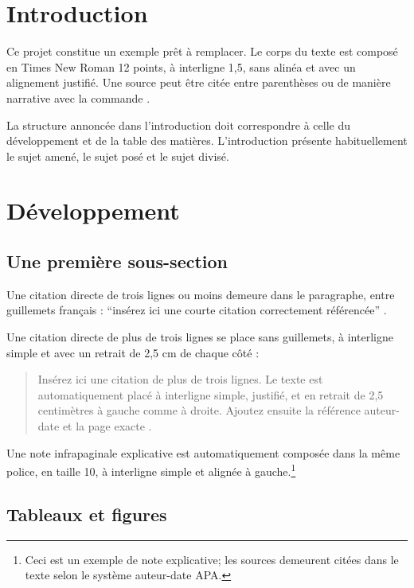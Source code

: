 \section{Introduction}

Ce projet constitue un exemple prêt à remplacer. Le corps du texte est composé en Times New Roman 12 points, à interligne 1,5, sans alinéa et avec un alignement justifié. Une source peut être citée entre parenthèses \parencite[33--40]{gaudreau2011} ou de manière narrative avec la commande \textcite{loiseau2026}.

La structure annoncée dans l'introduction doit correspondre à celle du développement et de la table des matières. L'introduction présente habituellement le sujet amené, le sujet posé et le sujet divisé.

\section{Développement}

\subsection{Une première sous-section}

Une citation directe de trois lignes ou moins demeure dans le paragraphe, entre guillemets français : \enquote{insérez ici une courte citation correctement référencée} \parencite[18]{loiseau2026}.

Une citation directe de plus de trois lignes se place sans guillemets, à interligne simple et avec un retrait de 2,5 cm de chaque côté :

\begin{quote}
Insérez ici une citation de plus de trois lignes. Le texte est automatiquement placé à interligne simple, justifié, et en retrait de 2,5 centimètres à gauche comme à droite. Ajoutez ensuite la référence auteur-date et la page exacte \parencite[19]{loiseau2026}.
\end{quote}

Une note infrapaginale explicative est automatiquement composée dans la même police, en taille 10, à interligne simple et alignée à gauche.\footnote{Ceci est un exemple de note explicative; les sources demeurent citées dans le texte selon le système auteur-date APA.}

\subsection{Tableaux et figures}


